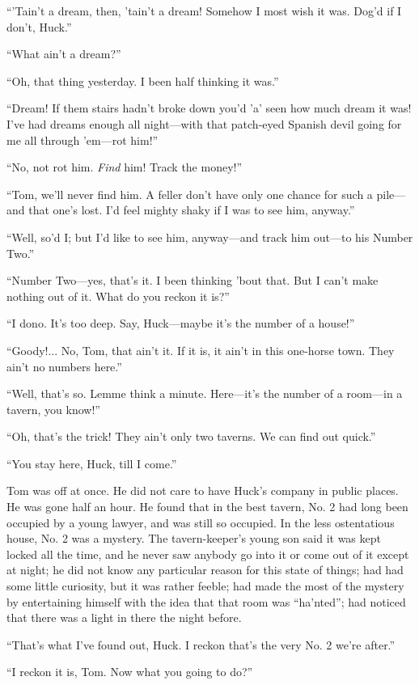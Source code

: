 \documentclass{book}
\begin{document}
“’Tain’t a dream, then, ’tain’t a dream! Somehow I most wish it was. Dog’d if I don’t, Huck.”

“What ain’t a dream?”

“Oh, that thing yesterday. I been half thinking it was.”

“Dream! If them stairs hadn’t broke down you’d ’a’ seen how much dream it was! I’ve had dreams enough all night—with that patch-eyed Spanish devil going for me all through ’em—rot him!”

“No, not rot him. \emph{Find} him! Track the money!”

“Tom, we’ll never find him. A feller don’t have only one chance for such a pile—and that one’s lost. I’d feel mighty shaky if I was to see him, anyway.”

“Well, so’d I; but I’d like to see him, anyway—and track him out—to his Number Two.”

“Number Two—yes, that’s it. I been thinking ’bout that. But I can’t make nothing out of it. What do you reckon it is?”

“I dono. It’s too deep. Say, Huck—maybe it’s the number of a house!”

“Goody!... No, Tom, that ain’t it. If it is, it ain’t in this one-horse town. They ain’t no numbers here.”

“Well, that’s so. Lemme think a minute. Here—it’s the number of a room—in a tavern, you know!”

“Oh, that’s the trick! They ain’t only two taverns. We can find out quick.”

“You stay here, Huck, till I come.”

Tom was off at once. He did not care to have Huck’s company in public places. He was gone half an hour. He found that in the best tavern, No. 2 had long been occupied by a young lawyer, and was still so occupied. In the less ostentatious house, No. 2 was a mystery. The tavern-keeper’s young son said it was kept locked all the time, and he never saw anybody go into it or come out of it except at night; he did not know any particular reason for this state of things; had had some little curiosity, but it was rather feeble; had made the most of the mystery by entertaining himself with the idea that that room was “ha’nted”; had noticed that there was a light in there the night before.

“That’s what I’ve found out, Huck. I reckon that’s the very No. 2 we’re after.”

“I reckon it is, Tom. Now what you going to do?”
\end{document}
